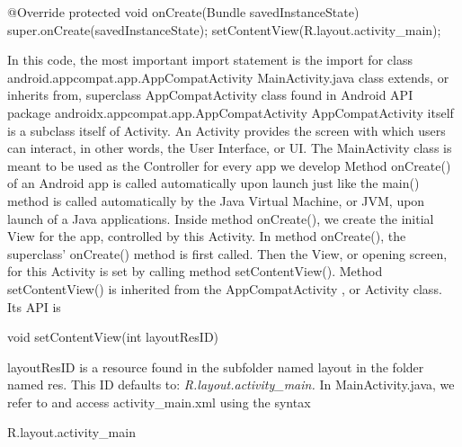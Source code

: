 \documentclass{report}
\begin{document}
\begin{itemize}
\begin{javacode}
{                    @Override
                    protected void onCreate(Bundle savedInstanceState) {
                        super.onCreate(savedInstanceState);
                        setContentView(R.layout.activity_main);
                    }
                }           
            \end{javacode}
            \bigbreak \noindent 
            In this code, the most important import statement is the import for class android.appcompat.app.AppCompatActivity
            \bigbreak \noindent 
            MainActivity.java class extends, or inherits from, superclass AppCompatActivity class found in Android API package androidx.appcompat.app.AppCompatActivity
            \bigbreak \noindent 
            AppCompatActivity itself is a subclass itself of Activity.
            \bigbreak \noindent 
            An Activity provides the screen with which users can interact, in other words, the User Interface, or UI.
            \bigbreak \noindent 
            The MainActivity class is meant to be used as the Controller for every app we develop
            \bigbreak \noindent 
            Method onCreate() of an Android app is called automatically upon launch just like the main() method is called automatically by the Java Virtual Machine, or JVM, upon launch of a Java applications.
            \bigbreak \noindent 
            Inside method onCreate(), we create the initial View for the app, controlled by this Activity.
            \bigbreak \noindent 
            In method onCreate(), the superclass' onCreate() method is first called.
            \bigbreak \noindent 
            Then the View, or opening screen, for this Activity is set by calling method setContentView().
            \bigbreak \noindent 
            Method setContentView() is inherited from the AppCompatActivity , or Activity class.
            \bigbreak \noindent 
            Its API is 
            \bigbreak \noindent 
            \begin{javacode}
            void setContentView(int layoutResID)
            \end{javacode}
            \bigbreak \noindent 
            layoutResID is a resource found in the subfolder named layout in the folder named res.
            \bigbreak \noindent 
            This ID defaults to: \textit{R.layout.activity\_main.}
            \bigbreak \noindent 
            In MainActivity.java, we refer to and access activity\_main.xml using the syntax
            \bigbreak \noindent 
            \begin{javacode}
            R.layout.activity_main

\end{javacode}
\end{itemize}
\end{document}
